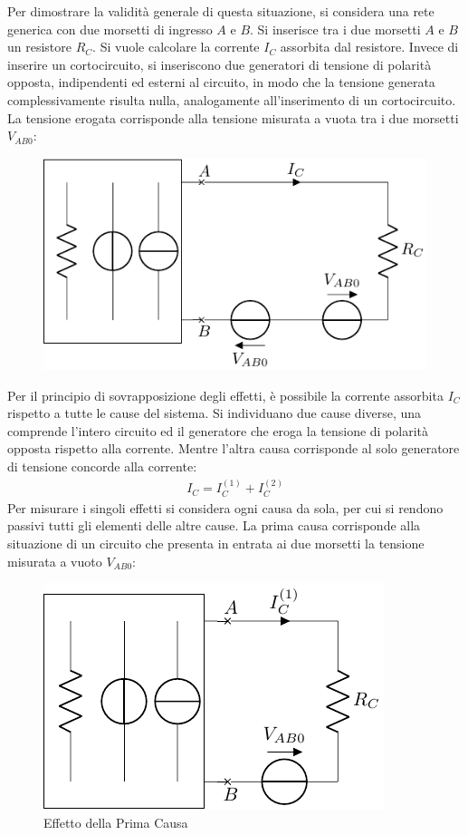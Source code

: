 \documentclass{article}
\numberwithin{equation}{subsection}
\begin{document}
Per dimostrare la validità generale di questa situazione, si considera una rete generica con due morsetti di ingresso $A$ e $B$. 
Si inserisce tra i due morsetti $A$ e $B$ un resistore $R_C$. Si vuole calcolare la corrente $I_C$ assorbita 
dal resistore. Invece di inserire un cortocircuito, si inseriscono due generatori di tensione di polarità opposta, indipendenti ed esterni al circuito, in modo che la tensione 
generata complessivamente risulta nulla, analogamente all'inserimento di un cortocircuito. La tensione erogata corrisponde alla tensione misurata a vuota tra i due morsetti 
$V_{AB0}$: 
\begin{figure}[H]%
    \centering
    \includegraphics{calcolo-corrente-carico.pdf}%
    \label{fig:calcolo-corrente-carico}
\end{figure}
Per il principio di sovrapposizione degli effetti, è possibile la corrente assorbita $I_C$ rispetto a tutte le cause del sistema. Si individuano due cause diverse, una 
comprende l'intero circuito ed il generatore che eroga la tensione di polarità opposta rispetto alla corrente. Mentre l'altra causa corrisponde al solo generatore di 
tensione concorde alla corrente:
\begin{gather*}
    I_C=I_C^{(1)}+I_C^{(2)}
\end{gather*} 
Per misurare i singoli effetti si considera ogni causa da sola, per cui si rendono passivi tutti gli elementi delle altre cause. 
La prima causa corrisponde alla situazione di un circuito che presenta in entrata ai due morsetti la tensione misurata a vuoto $V_{AB0}$: 
\begin{figure}[H]%
    \centering
    \includegraphics{prima-causa-corrente-carico.pdf}%
    \caption{Effetto della Prima Causa}%
    \label{fig:prima-causa-corrente-carico}
\end{figure} 
\end{document}
